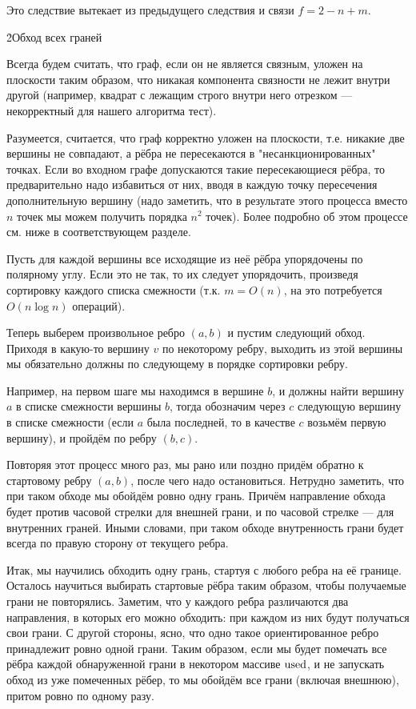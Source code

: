 Это следствие вытекает из предыдущего следствия и связи $f = 2 - n + m$.


\h2{Обход всех граней}

Всегда будем считать, что граф, если он не является связным, уложен на плоскости таким образом, что никакая компонента связности не лежит внутри другой (например, квадрат с лежащим строго внутри него отрезком --- некорректный для нашего алгоритма тест).

Разумеется, считается, что граф корректно уложен на плоскости, т.е. никакие две вершины не совпадают, а рёбра не пересекаются в "несанкционированных" точках. Если во входном графе допускаются такие пересекающиеся рёбра, то предварительно надо избавиться от них, вводя в каждую точку пересечения дополнительную вершину (надо заметить, что в результате этого процесса вместо $n$ точек мы можем получить порядка $n^2$ точек). Более подробно об этом процессе см. ниже в соответствующем разделе.

Пусть для каждой вершины все исходящие из неё рёбра упорядочены по полярному углу. Если это не так, то их следует упорядочить, произведя сортировку каждого списка смежности (т.к. $m = O(n)$, на это потребуется $O (n \log n)$ операций).

Теперь выберем произвольное ребро $(a,b)$ и пустим следующий обход. Приходя в какую-то вершину $v$ по некоторому ребру, выходить из этой вершины мы обязательно должны по следующему в порядке сортировки ребру.

Например, на первом шаге мы находимся в вершине $b$, и должны найти вершину $a$ в списке смежности вершины $b$, тогда обозначим через $c$ следующую вершину в списке смежности (если $a$ была последней, то в качестве $c$ возьмём первую вершину), и пройдём по ребру $(b,c)$.

Повторяя этот процесс много раз, мы рано или поздно придём обратно к стартовому ребру $(a,b)$, после чего надо остановиться. Нетрудно заметить, что при таком обходе мы обойдём ровно одну грань. Причём направление обхода будет против часовой стрелки для внешней грани, и по часовой стрелке --- для внутренних граней. Иными словами, при таком обходе внутренность грани будет всегда по правую сторону от текущего ребра.

Итак, мы научились обходить одну грань, стартуя с любого ребра на её границе. Осталось научиться выбирать стартовые рёбра таким образом, чтобы получаемые грани не повторялись. Заметим, что у каждого ребра различаются два направления, в которых его можно обходить: при каждом из них будут получаться свои грани. С другой стороны, ясно, что одно такое ориентированное ребро принадлежит ровно одной грани. Таким образом, если мы будет помечать все рёбра каждой обнаруженной грани в некотором массиве $\rm used$, и не запускать обход из уже помеченных рёбер, то мы обойдём все грани (включая внешнюю), притом ровно по одному разу.

